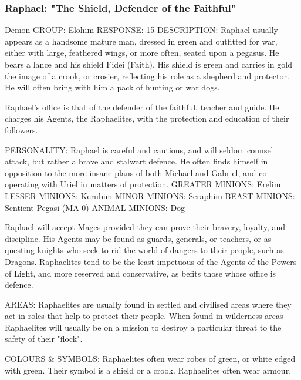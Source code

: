 \subsubsection{Raphael: "The Shield, Defender of the Faithful"}

\begin{Description}

\item[Type] Demon
GROUP: Elohim
RESPONSE: 15%
DESCRIPTION: Raphael usually appears as a handsome mature man, dressed in green and outfitted for war, either with large, feathered wings, or more often, seated upon a pegasus. He bears a lance and his shield Fidei (Faith).  His shield is green and carries in gold the image of a crook, or crosier, reflecting his role as a shepherd and protector. He will often bring with him a pack of hunting or war dogs.

\item[Sphere] Raphael's office is that of the defender of the faithful, teacher and guide.  He charges his Agents, the Raphaelites, with the protection and education of their followers.

  PERSONALITY: Raphael is careful and cautious, and will seldom counsel attack, but rather a brave and stalwart defence. He often finds himself in opposition to the more insane plans of both Michael and Gabriel, and co-operating with Uriel in matters of protection.
GREATER MINIONS: Erelim 
LESSER MINIONS: Kerubim 
MINOR MINIONS: Seraphim 
BEAST MINIONS: Sentient Pegasi (MA 0)
ANIMAL MINIONS: Dog

\item[Agents] Raphael will accept Mages provided they can prove their bravery, loyalty, and discipline. His Agents may be found as guards, generals, or teachers, or as questing knights who seek to rid the world of dangers to their people, such as Dragons. Raphaelites tend to be the least impetuous of the Agents of the Powers of Light, and more reserved and conservative, as befits those whose office is defence.

AREAS: Raphaelites are usually found in settled and civilised areas where they act in roles that help to protect their people. When found in wilderness areas Raphaelites will usually be on a mission to destroy a particular threat to the safety of their "flock".

COLOURS \& SYMBOLS: Raphaelites often wear robes of green, or white edged with green. Their symbol is a shield or a crook. Raphaelites often wear armour.


\end{Description}
